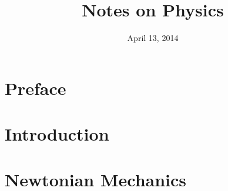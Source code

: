 \documentclass[oneside]{book}
\title{Notes on Physics}
\date{April 13, 2014}
\begin{document}
\frontmatter
\hypersetup{pageanchor=false}
\maketitle

\chapter{Preface}
\hypersetup{pageanchor=true}


\tableofcontents

\mainmatter
\chapter{Introduction}


\chapter{Newtonian Mechanics}


\backmatter
\appendix

\end{document}
